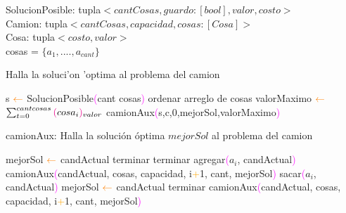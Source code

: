 \noindent
SolucionPosible: tupla$<cantCosas, guardo:[bool], valor, costo>$ \\
Camion: tupla$<cantCosas, capacidad, cosas: [Cosa]>$ \\
Cosa: tupla$<costo, valor>$ \\
cosas = $\{a_1,....,a_{cant}\}$ \\

\begin{algorithm}
\caption{Halla la soluci'on 'optima al problema del camion}
\begin{algorithmic}[1]
    \STATE s $\textcolor{orange}{\leftarrow}$ SolucionPosible\textcolor{magenta}{(}cant cosas\textcolor{magenta}{)}
    \STATE ordenar arreglo de cosas 
    \STATE valorMaximo $\textcolor{orange}{\leftarrow}$ $\sum_{t=0}^{cant cosas} \textcolor{magenta}{(}cosa_i\textcolor{magenta}{)}_{valor}$ 
    \STATE camionAux\textcolor{magenta}{(}s,c,0,mejorSol,valorMaximo\textcolor{magenta}{)}
\end{algorithmic}
\end{algorithm}

\begin{algorithm}
\caption{camionAux: Halla la solución óptima $mejorSol$ al problema del camion}
\begin{algorithmic}[1]
        \STATE mejorSol $\textcolor{orange}{\leftarrow}$ candActual
        \STATE terminar
    \ENDIF    
        \STATE terminar
    \ELSE
                    \STATE agregar\textcolor{magenta}{(}$a_i$, candActual\textcolor{magenta}{)}
                    \STATE camionAux\textcolor{magenta}{(}candActual, cosas, capacidad, i\textcolor{orange}{+}1, cant, mejorSol\textcolor{magenta}{)}
                    \STATE sacar\textcolor{magenta}{(}$a_i$, candActual\textcolor{magenta}{)}
            		\ELSE
            								\STATE {}
       											  	\STATE mejorSol $\textcolor{orange}{\leftarrow}$ candActual
        										\ENDIF	       
        										\STATE terminar
        				\ENDIF
         \STATE camionAux\textcolor{magenta}{(}candActual, cosas, capacidad, i\textcolor{orange}{+}1, cant, mejorSol\textcolor{magenta}{)}
    \ENDIF
   \ENDIF
\end{algorithmic}
\end{algorithm}